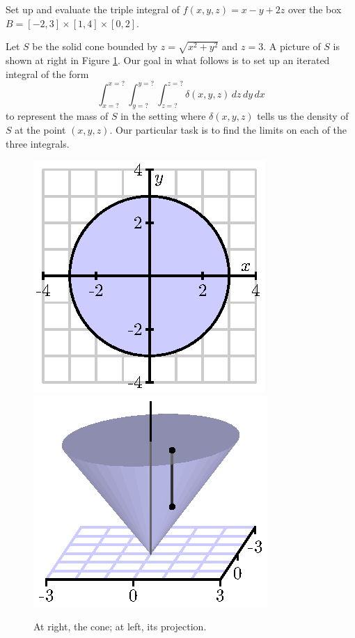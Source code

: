 \begin{activity} \label{A:11.7.3} 

\ba
	\item Set up and evaluate the triple integral of $f(x,y,z) = x-y+2z$ over the box $B = [-2,3] \times [1,4] \times [0,2]$.

	\item Let $S$ be the solid cone bounded by $z = \sqrt{x^2+y^2}$ and $z=3$. A picture of $S$ is shown at right in Figure \ref{F:11.7.Cone_and_Cone_proj}. Our goal in what follows is to set up an iterated integral of the form
\begin{equation} \label{eq:11.7.TI_not_box}
\int_{x=?}^{x=?} \int_{y=?}^{y=?} \int_{z=?}^{z=?} \delta(x,y,z) \, dz \, dy \, dx
\end{equation}
to represent the mass of $S$ in the setting where $\delta(x,y,z)$ tells us the density of $S$ at the point $(x,y,z)$. Our particular task is to find the limits on each of the three integrals.
\begin{figure}[ht]
\begin{center}
    \includegraphics{figures/fig_11_7_cone_project.eps}
  \hspace{1.0in}
  \includegraphics{figures/fig_11_7_cone.eps}
\caption{At right, the cone; at left, its projection.}
\label{F:11.7.Cone_and_Cone_proj}
\end{center}
\end{figure}


\end{activity}
